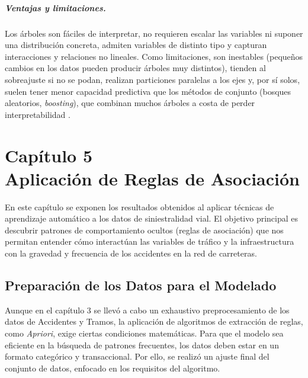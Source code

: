 \documentclass[twoside,a4paper,12pt,onecolumn,openany]{book}
\begin{document}
\paragraph{Ventajas y limitaciones.} Los árboles son fáciles de interpretar, no requieren escalar las variables ni suponer una distribución concreta, admiten variables de distinto tipo y capturan interacciones y relaciones no lineales. Como limitaciones, son inestables (pequeños cambios en los datos pueden producir árboles muy distintos), tienden al sobreajuste si no se podan, realizan particiones paralelas a los ejes y, por sí solos, suelen tener menor capacidad predictiva que los métodos de conjunto (bosques aleatorios, \textit{boosting}), que combinan muchos árboles a costa de perder interpretabilidad \cite{tema2_clasificacion}.
 


\setcounter{chapter}{5}
\chapter*{Capítulo 5 \\ \vspace{1cm} Aplicación de Reglas de Asociación}

\setcounter{section}{0}
\setcounter{subsection}{0}
\setcounter{figure}{0} \setcounter{table}{0}

En este capítulo se exponen los resultados obtenidos al aplicar técnicas de aprendizaje automático a los datos de siniestralidad vial. El objetivo principal es descubrir patrones de comportamiento ocultos (reglas de asociación) que nos permitan entender cómo interactúan las variables de tráfico y la infraestructura con la gravedad y frecuencia de los accidentes en la red de carreteras.

\section{Preparación de los Datos para el Modelado}

Aunque en el capítulo 3 se llevó a cabo un exhaustivo preprocesamiento de los datos de Accidentes y Tramos, la aplicación de algoritmos de extracción de reglas, como \textit{Apriori}, exige ciertas condiciones matemáticas. Para que el modelo sea eficiente en la búsqueda de patrones frecuentes, los datos deben estar en un formato categórico y transaccional. Por ello, se realizó un ajuste final del conjunto de datos, enfocado en los requisitos del algoritmo.
\end{document}
